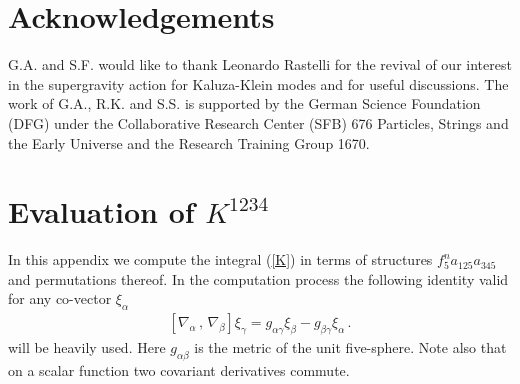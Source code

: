 \documentclass[12pt,a4paper]{article}
\numberwithin{equation}{section}
\newcommand{\bal}{\begin{equation}\begin{aligned}}
\newcommand{\eal}{\end{aligned}\end{equation}}
\def\la{\label}
\def\a {\alpha}
\def\b {\beta}
\def\g {\gamma}
\def\na{{\nabla}}
\def\a {\alpha}
\def\b {\beta}
\def\g {\gamma}
\def\la{\label}
\begin{document}
\section{Acknowledgements}
G.A. and S.F. would like to thank Leonardo Rastelli for the revival of our interest in the supergravity action for Kaluza-Klein modes  and for useful discussions. 
The work of G.A., R.K. and S.S. is supported by the German Science Foundation (DFG) 
under the Collaborative Research Center (SFB) 676 Particles, Strings and the Early Universe and the Research Training Group 1670.




\appendix

\section{Evaluation of $K^{1234}$}
In this appendix we compute the integral (\ref{K}) in terms of structures $f_5^na_{125}a_{345}$ and permutations thereof. 
In the computation process the following identity
valid for any co-vector $\xi_\a$ 
\bal
\la{comm}
 \left[\na_\a\,,\, \na_\b\right] \xi_\g=g_{\a\g}\xi_\b-g_{\b\g}\xi_\a\,.
\eal
will be heavily used. Here $g_{\a\beta}$ is the metric of the unit five-sphere. Note also that on a scalar function two covariant derivatives commute.
\smallskip
\end{document}
